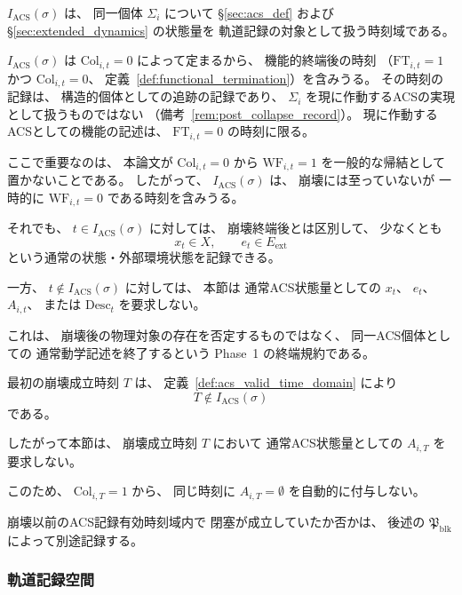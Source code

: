 \begin{remark}[有効時刻域は崩壊前の通常ACS記述域である]
\label{rem:acs_valid_time_domain_scope}
$I_{\mathrm{ACS}}(\sigma)$ は、
同一個体 $\Sigma_i$ について
\S\ref{sec:acs_def} および \S\ref{sec:extended_dynamics} の状態量を
軌道記録の対象として扱う時刻域である。

$I_{\mathrm{ACS}}(\sigma)$ は
$\mathrm{Col}_{i,t}=0$ によって定まるから、
機能的終端後の時刻
（$\mathrm{FT}_{i,t}=1$ かつ $\mathrm{Col}_{i,t}=0$、
定義~\ref{def:functional_termination}）を含みうる。
その時刻の記録は、
構造的個体としての追跡の記録であり、
$\Sigma_i$ を現に作動するACSの実現として扱うものではない
（備考~\ref{rem:post_collapse_record}）。
現に作動するACSとしての機能の記述は、
$\mathrm{FT}_{i,t}=0$ の時刻に限る。

ここで重要なのは、
本論文が
$\mathrm{Col}_{i,t}=0$
から
$\mathrm{WF}_{i,t}=1$
を一般的な帰結として置かないことである。
したがって、
$I_{\mathrm{ACS}}(\sigma)$ は、
崩壊には至っていないが
一時的に
$\mathrm{WF}_{i,t}=0$
である時刻を含みうる。

それでも、
$t\in I_{\mathrm{ACS}}(\sigma)$
に対しては、
崩壊終端後とは区別して、
少なくとも
\[
  x_t\in X,
  \qquad
  e_t\in E_{\mathrm{ext}}
\]
という通常の状態・外部環境状態を記録できる。

一方、
$t\notin I_{\mathrm{ACS}}(\sigma)$
に対しては、
本節は
通常ACS状態量としての
$x_t$、
$e_t$、
$A_{i,t}$、
または
$\mathrm{Desc}_t$
を要求しない。

これは、
崩壊後の物理対象の存在を否定するものではなく、
同一ACS個体としての
通常動学記述を終了するという
Phase~1 の終端規約である。
\end{remark}

\begin{remark}[崩壊成立時刻に閉塞を自動付与しない]
\label{rem:no_blockage_at_collapse_time_by_default}
最初の崩壊成立時刻 $T$ は、
定義~\ref{def:acs_valid_time_domain} により
\[
  T\notin I_{\mathrm{ACS}}(\sigma)
\]
である。

したがって本節は、
崩壊成立時刻 $T$ において
通常ACS状態量としての
$A_{i,T}$
を要求しない。

このため、
$\mathrm{Col}_{i,T}=1$
から、
同じ時刻に
$A_{i,T}=\emptyset$
を自動的に付与しない。

崩壊以前のACS記録有効時刻域内で
閉塞が成立していたか否かは、
後述の
$\mathfrak{P}_{\mathrm{blk}}$
によって別途記録する。
\end{remark}

\subsubsection{軌道記録空間}


